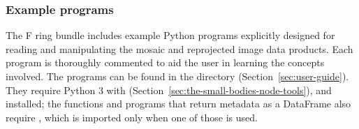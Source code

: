 \subsubsection{Example programs}
\label{sec:example-programs}

The F ring bundle includes example Python programs explicitly designed for reading and manipulating the mosaic and reprojected image data products. Each program is thoroughly commented to aid the user in learning the concepts involved. The programs can be found in the  directory (Section~\ref{sec:user-guide}). They require Python 3 with  (Section~\ref{sec:the-small-bodies-node-tools}),  and  installed; the functions and programs that return metadata as a DataFrame also require , which is imported only when one of those is used.

